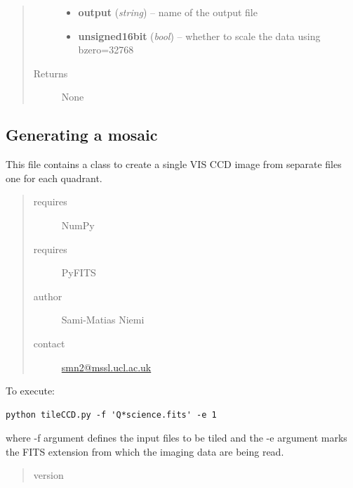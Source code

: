 \documentclass[a4paper,12pt,english]{sphinxmanual}
\begin{document}
\begin{fulllineitems}
\begin{fulllineitems}
\begin{quote}
\begin{description}
\begin{itemize}
\item {} 
\textbf{output} (\emph{string}) -- name of the output file

\item {} 
\textbf{unsigned16bit} (\emph{bool}) -- whether to scale the data using bzero=32768

\end{itemize}

\item[{Returns}] \leavevmode
None

\end{description}\end{quote}

\end{fulllineitems}


\end{fulllineitems}

\label{postproc:module-postproc.tileCCD}

\subsection{Generating a mosaic}
\label{postproc:generating-a-mosaic}
This file contains a class to create a single VIS CCD image from separate files one for each quadrant.
\begin{quote}\begin{description}
\item[{requires}] \leavevmode
NumPy

\item[{requires}] \leavevmode
PyFITS

\item[{author}] \leavevmode
Sami-Matias Niemi

\item[{contact}] \leavevmode
\href{mailto:smn2@mssl.ucl.ac.uk}{smn2@mssl.ucl.ac.uk}

\end{description}\end{quote}

To execute:

\begin{Verbatim}[commandchars=\\\{\}]
python tileCCD.py -f 'Q*science.fits' -e 1
\end{Verbatim}

where -f argument defines the input files to be tiled and the -e argument marks the
FITS extension from which the imaging data are being read.
\begin{quote}\begin{description}
\item[{version}] 

\end{description}\end{quote}
\end{document}
